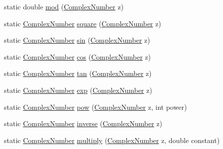 \begin{DoxyCompactItemize}
\item 
static double \hyperlink{classcom_1_1ars_1_1complexnumbers_1_1_complex_math_a1ffa4f4678b201779a1ac8212fc93e05}{mod} (\hyperlink{classcom_1_1ars_1_1complexnumbers_1_1_complex_number}{Complex\+Number} z)
\item 
static \hyperlink{classcom_1_1ars_1_1complexnumbers_1_1_complex_number}{Complex\+Number} \hyperlink{classcom_1_1ars_1_1complexnumbers_1_1_complex_math_ae8123eba1e8ecec75ed3d9fd05410ca2}{square} (\hyperlink{classcom_1_1ars_1_1complexnumbers_1_1_complex_number}{Complex\+Number} z)
\item 
static \hyperlink{classcom_1_1ars_1_1complexnumbers_1_1_complex_number}{Complex\+Number} \hyperlink{classcom_1_1ars_1_1complexnumbers_1_1_complex_math_a9c1d532e50ed32d01ccdb34d85e8765d}{sin} (\hyperlink{classcom_1_1ars_1_1complexnumbers_1_1_complex_number}{Complex\+Number} z)
\item 
static \hyperlink{classcom_1_1ars_1_1complexnumbers_1_1_complex_number}{Complex\+Number} \hyperlink{classcom_1_1ars_1_1complexnumbers_1_1_complex_math_a0ef9a0fc1769a14c5f81f89866643f19}{cos} (\hyperlink{classcom_1_1ars_1_1complexnumbers_1_1_complex_number}{Complex\+Number} z)
\item 
static \hyperlink{classcom_1_1ars_1_1complexnumbers_1_1_complex_number}{Complex\+Number} \hyperlink{classcom_1_1ars_1_1complexnumbers_1_1_complex_math_af260af539eaec79d57b7e5363bda686e}{tan} (\hyperlink{classcom_1_1ars_1_1complexnumbers_1_1_complex_number}{Complex\+Number} z)
\item 
static \hyperlink{classcom_1_1ars_1_1complexnumbers_1_1_complex_number}{Complex\+Number} \hyperlink{classcom_1_1ars_1_1complexnumbers_1_1_complex_math_a9a15203fe621aaa3738dd41d19b70b5f}{exp} (\hyperlink{classcom_1_1ars_1_1complexnumbers_1_1_complex_number}{Complex\+Number} z)
\item 
static \hyperlink{classcom_1_1ars_1_1complexnumbers_1_1_complex_number}{Complex\+Number} \hyperlink{classcom_1_1ars_1_1complexnumbers_1_1_complex_math_a0e31bcd8237beabdee3f1480e8667d83}{pow} (\hyperlink{classcom_1_1ars_1_1complexnumbers_1_1_complex_number}{Complex\+Number} z, int power)
\item 
static \hyperlink{classcom_1_1ars_1_1complexnumbers_1_1_complex_number}{Complex\+Number} \hyperlink{classcom_1_1ars_1_1complexnumbers_1_1_complex_math_a06897e69e7c59bf707851f4a502d11b8}{inverse} (\hyperlink{classcom_1_1ars_1_1complexnumbers_1_1_complex_number}{Complex\+Number} z)
\item 
static \hyperlink{classcom_1_1ars_1_1complexnumbers_1_1_complex_number}{Complex\+Number} \hyperlink{classcom_1_1ars_1_1complexnumbers_1_1_complex_math_aea5e553e5a5e3e519df64cb155699198}{multiply} (\hyperlink{classcom_1_1ars_1_1complexnumbers_1_1_complex_number}{Complex\+Number} z, double constant)

\end{DoxyCompactItemize}
